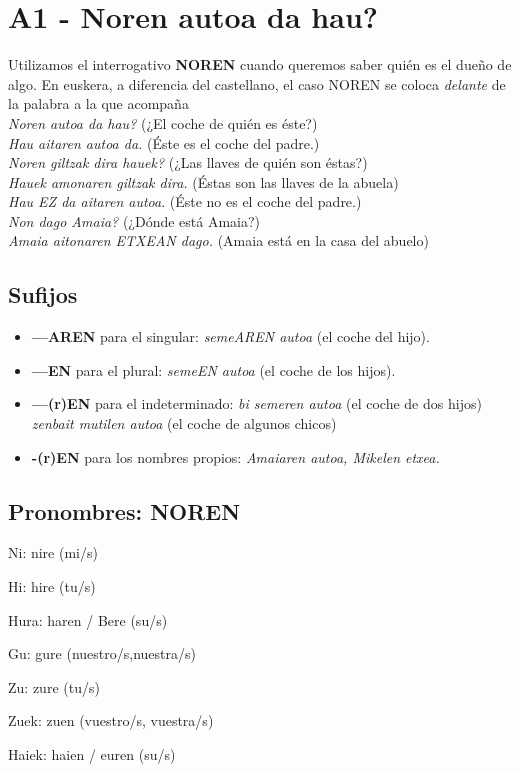 \documentclass[11pt, a4paper]{article}
\begin{document}
\section{A1 - Noren autoa da hau?}
\noindent Utilizamos el interrogativo \textbf{NOREN} cuando queremos saber quién es el dueño de algo. En euskera, a diferencia del castellano, el caso NOREN se coloca \textit{delante} de la palabra a la que acompaña\\

\indent \textit{Noren autoa da hau?} (¿El coche de quién es éste?)\\
\indent \textit{Hau aitaren autoa da.} (Éste es el coche del padre.)\\
\indent \textit{Noren giltzak dira hauek?} (¿Las llaves de quién son éstas?) \\
\indent \textit{Hauek amonaren giltzak dira.} (Éstas son las llaves de la abuela)\\

\indent \textit{Hau EZ da aitaren autoa}. (Éste no es el coche del padre.)\\

\indent \textit{Non dago Amaia?}
(¿Dónde está Amaia?)\\
\indent \textit{Amaia aitonaren ETXEAN dago.} (Amaia está en la casa del abuelo)

\subsection{Sufijos}
\begin{itemize}
\item \textbf{—AREN} para el singular: \textit{semeAREN autoa} (el coche del hijo).
\item \textbf{—EN} para el plural: \textit{semeEN autoa} (el coche de los hijos).
\item \textbf{—(r)EN} para el indeterminado: \textit{bi semeren autoa} (el coche de dos hijos)\\
\textit{zenbait mutilen autoa} (el coche de algunos chicos)
\item \textbf{-(r)EN} para los nombres propios: \textit{Amaiaren autoa, Mikelen etxea.}
\end{itemize}

\subsection{Pronombres: NOREN}
\begin{itemize}
\begin{multicols}{2}
\item Ni: nire (mi/s)
\item Hi: hire (tu/s)
\item Hura: haren / Bere (su/s)\\
\item Gu: gure (nuestro/s,nuestra/s)
\item Zu: zure (tu/s)
\item Zuek: zuen (vuestro/s, vuestra/s)
\item Haiek: haien / euren (su/s)
\end{multicols}
\end{itemize}
\end{document}
